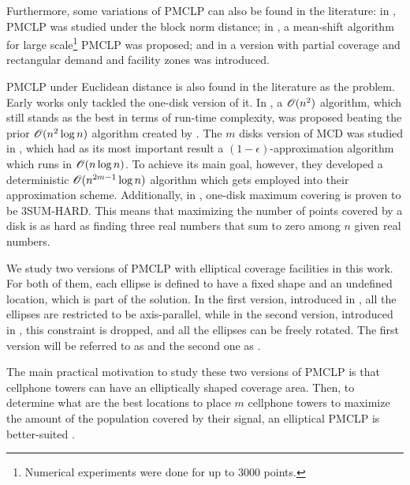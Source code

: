 Furthermore, some variations of PMCLP can also be found in the literature: in , PMCLP was studied under the block norm distance; in , a mean-shift algorithm for large scale\footnote{Numerical experiments were done for up to $3000$ points.} PMCLP was proposed; and in  a version with partial coverage and rectangular demand and facility zones was introduced.

PMCLP under Euclidean distance is also found in the literature as the  problem.
Early works only tackled the one-disk version of it. In , a $\mathscr{O}(n^2)$ algorithm, which still stands as the best in terms of run-time complexity, was proposed beating the prior $\mathscr{O}(n^2\log{n})$ algorithm created by .
The $m$ disks version of MCD was studied in , which had as its most important result a $(1-\epsilon)$-approximation algorithm which runs in $\mathscr{O}(n\log{n})$. To achieve its main goal, however, they developed a deterministic $\mathscr{O}(n^{2m-1}\log{n})$ algorithm which gets employed into their approximation scheme.
Additionally, in , one-disk maximum covering is proven to be 3SUM-HARD. This means that maximizing the number of points covered by a disk is as hard as finding three real numbers that sum to zero among $n$ given real numbers.

We study two versions of PMCLP with elliptical coverage facilities in this work. For both of them, each ellipse is defined to have a fixed shape and an undefined location, which is part of the solution.
In the first version, introduced in , all the ellipses are restricted to be axis-parallel, while in the second version, introduced in , this constraint is dropped, and all the ellipses can be freely rotated.
The first version will be referred to as  and the second one as  .

The main practical motivation to study these two versions of PMCLP is that cellphone towers can have an elliptically shaped coverage area. Then, to determine what are the best locations to place $m$ cellphone towers to maximize the amount of the population covered by their signal, an elliptical PMCLP is better-suited \cite{canbolat}.

